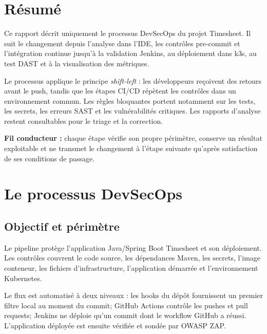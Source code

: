 \documentclass[11pt,a4paper,oneside]{report}
\begin{document}
\chapter*{Résumé}
Ce rapport décrit uniquement le processus DevSecOps du projet Timesheet. Il suit le changement depuis l'analyse dans l'IDE, les contrôles pre-commit et l'intégration continue jusqu'à la validation Jenkins, au déploiement dans k3s, au test DAST et à la visualisation des métriques.

Le processus applique le principe \emph{shift-left} : les développeurs reçoivent des retours avant le push, tandis que les étapes CI/CD répètent les contrôles dans un environnement commun. Les règles bloquantes portent notamment sur les tests, les secrets, les erreurs SAST et les vulnérabilités critiques. Les rapports d'analyse restent consultables pour le triage et la correction.

\begin{infobox}
\textbf{Fil conducteur :} chaque étape vérifie son propre périmètre, conserve un résultat exploitable et ne transmet le changement à l'étape suivante qu'après satisfaction de ses conditions de passage.
\end{infobox}

\tableofcontents
\listoffigures
\clearpage
{}

\chapter{Le processus DevSecOps}

\section{Objectif et périmètre}
Le pipeline protège l'application Java/Spring Boot Timesheet et son déploiement. Les contrôles couvrent le code source, les dépendances Maven, les secrets, l'image conteneur, les fichiers d'infrastructure, l'application démarrée et l'environnement Kubernetes.

Le flux est automatisé à deux niveaux : les hooks du dépôt fournissent un premier filtre local au moment du commit; GitHub Actions contrôle les pushes et pull requests; Jenkins ne déploie qu'un commit dont le workflow GitHub a réussi. L'application déployée est ensuite vérifiée et sondée par OWASP ZAP.
\end{document}

